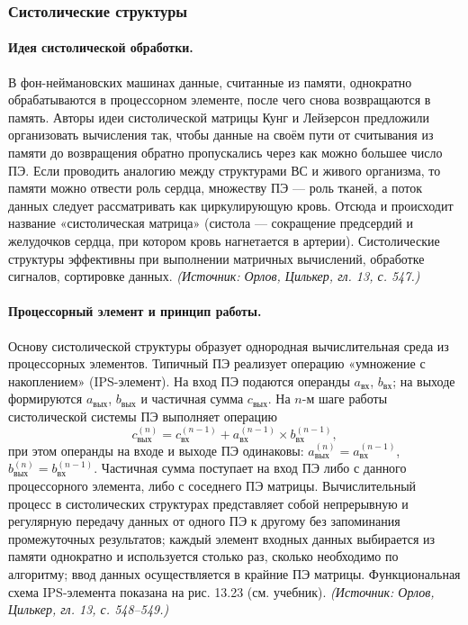 \documentclass[a4paper,12pt]{article}
\begin{document}
\subsubsection{Систолические структуры}

\paragraph{Идея систолической обработки.}
В фон-неймановских машинах данные, считанные из памяти, однократно обрабатываются в процессорном элементе, после чего снова возвращаются в память. Авторы идеи систолической матрицы Кунг и Лейзерсон предложили организовать вычисления так, чтобы данные на своём пути от считывания из памяти до возвращения обратно пропускались через как можно большее число ПЭ. Если проводить аналогию между структурами ВС и живого организма, то памяти можно отвести роль сердца, множеству ПЭ — роль тканей, а поток данных следует рассматривать как циркулирующую кровь. Отсюда и происходит название «систолическая матрица» (систола — сокращение предсердий и желудочков сердца, при котором кровь нагнетается в артерии). Систолические структуры эффективны при выполнении матричных вычислений, обработке сигналов, сортировке данных.
\textit{(Источник: Орлов, Цилькер, гл. 13, с. 547.)}

\paragraph{Процессорный элемент и принцип работы.}
Основу систолической структуры образует однородная вычислительная среда из процессорных элементов. Типичный ПЭ реализует операцию «умножение с накоплением» (IPS-элемент). На вход ПЭ подаются операнды \(a_{вх}\), \(b_{вх}\); на выходе формируются \(a_{вых}\), \(b_{вых}\) и частичная сумма \(c_{вых}\). На \(n\)-м шаге работы систолической системы ПЭ выполняет операцию
\[
c^{(n)}_{вых}=c^{(n-1)}_{вх}+a^{(n-1)}_{вх}\times b^{(n-1)}_{вх},
\]
при этом операнды на входе и выходе ПЭ одинаковы: \(a^{(n)}_{вых}=a^{(n-1)}_{вх}\), \(b^{(n)}_{вых}=b^{(n-1)}_{вх}\). Частичная сумма поступает на вход ПЭ либо с данного процессорного элемента, либо с соседнего ПЭ матрицы. Вычислительный процесс в систолических структурах представляет собой непрерывную и регулярную передачу данных от одного ПЭ к другому без запоминания промежуточных результатов; каждый элемент входных данных выбирается из памяти однократно и используется столько раз, сколько необходимо по алгоритму; ввод данных осуществляется в крайние ПЭ матрицы. Функциональная схема IPS-элемента показана на рис. 13.23 (см. учебник).
\textit{(Источник: Орлов, Цилькер, гл. 13, с. 548--549.)}
\end{document}
